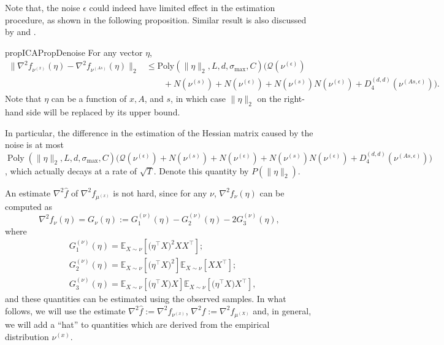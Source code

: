 \documentclass[11pt]{article}
\newcommand{\E}{\mathbb{E}}
\DeclareMathOperator{\pol}{Poly}
\newcommand{\poly}[1]{\pol\left(#1\right)}
\newcommand{\cQ}{\mathcal{Q}}
\newcommand{\eps}{\epsilon}
\begin{document}
Note that, the noise $\epsilon$ could indeed have limited effect in the estimation procedure, as shown in the following proposition. 
Similar result is also discussed by \citet{arora2012provable} and \citet{belkin2013blind}.
\begin{restatable}{prop}{ICAPropDenoise}
	\label{prop:denoise}
	For any vector $\eta$,
	\begin{align*}
	\| \nabla^2f_{\nu^{(x)}}(\eta) - \nabla^2f_{\nu^{(As)}}(\eta) \|_2 & \le \text{Poly}(\|\eta\|_2, L, d, \sigma_{\max}, C)\Big(\cQ(\nu^{(\epsilon)})\\
	& \qquad
	+N(\nu^{(s)})+ N(\nu^{(\eps)})+N(\nu^{(s)})N(\nu^{(\eps)})+ D_4^{(d,d)}(\nu^{(As,\eps)}) \Big). 
	\end{align*}
	Note that $\eta$ can be a function of $x, A$, and $s$, in which case $\|\eta\|_2$ on the right-hand side will be replaced by its upper bound.
\end{restatable}
In particular, the difference in the estimation of the Hessian matrix caused by the noise is at most $\poly{\|\eta\|_2, L, d, \sigma_{\max}, C}\big(\cQ(\nu^{(\epsilon)}) + N(\nu^{(s)})+ N(\nu^{(\eps)}) + N(\nu^{(s)})N(\nu^{(\eps)})+ D_4^{(d,d)}(\nu^{(As,\eps)}) \big)$, which actually decays at a rate of $\sqrt{T}$.
Denote this quantity by $P(\|\eta\|_2)$. 

An estimate $\nabla^2 \hat{f}$ of $\nabla^2f_{\mu^{(x)}}$ is not hard, since for any $\nu$,
$\nabla^2f_{\nu}(\eta)$  can be computed as
\begin{equation}
\label{eq:G}
\nabla^2 f_{\nu}(\eta) = G_{\nu}(\eta):= G_1^{(\nu)}(\eta) - G_2^{(\nu)}(\eta) -2G_3^{(\nu)}(\eta),
\end{equation}
where 
\begin{align*}
& G_1^{(\nu)}(\eta) =  \E_{X\sim \nu} [\big(\eta^{\top}X\big)^2XX^{\top}]; \\
& G_2^{(\nu)}(\eta) = \E_{X\sim \nu} [\big(\eta^{\top}X\big)^2] \E_{X\sim \nu} [XX^{\top}]; \\
& G_3^{(\nu)}(\eta) = \E_{X\sim \nu} [\big(\eta^{\top}X\big)X] \E_{X\sim \nu} [\big(\eta^{\top}X\big)X^{\top}],
\end{align*} 
and these quantities can be estimated using the observed samples. In what follows, we will use the estimate $\nabla^2 \widehat{f}:=\nabla^2 f_{\nu^{(x)}}$, $\nabla^2 f:=\nabla^2 f_{\mu^{(X)}}$ and, in general, we will add a ``hat'' to quantities which are derived from the empirical distribution $\nu^{(x)}$. 
\end{document}
